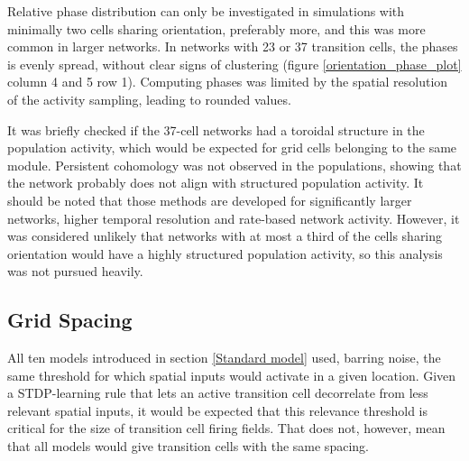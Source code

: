\documentclass{article}
\begin{document}
    Relative phase distribution can only be investigated in simulations with minimally two cells sharing orientation, preferably more, and this was more common in larger networks. In networks with 23 or 37 transition cells, the phases is evenly spread, without clear signs of clustering (figure \ref{orientation_phase_plot} column 4 and 5 row 1). Computing phases was limited by the spatial resolution of the activity sampling, leading to rounded values.
    
    It was briefly checked if the 37-cell networks had a toroidal structure in the population activity, which would be expected for grid cells belonging to the same module. Persistent cohomology was not observed in the populations, showing that the network probably does not align with structured population activity. It should be noted that those methods are developed for significantly larger networks, higher temporal resolution and rate-based network activity. However, it was considered unlikely that networks with at most a third of the cells sharing orientation would have a highly structured population activity, so this analysis was not pursued heavily.

    \subsection{Grid Spacing} \label{Spacing}

    All ten models introduced in section \ref{Standard model} used, barring noise, the same threshold for which spatial inputs would activate in a given location. Given a STDP-learning rule that lets an active transition cell decorrelate from less relevant spatial inputs, it would be expected that this relevance threshold is critical for the size of transition cell firing fields. That does not, however, mean that all models would give transition cells with the same spacing.
\end{document}
